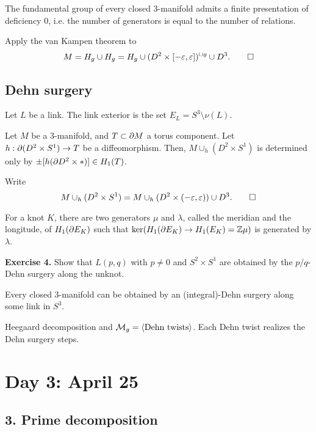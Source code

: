 \documentclass{../../../small}
\begin{document}
\begin{cor}
The fundamental group of every closed 3-manifold admits a finite presentation of deficiency 0, i.e. the number of generators is equal to the number of relations.
\end{cor}
\begin{pf}
Apply the van Kampen theorem to
\[M=H_g\cup H_g=H_g\cup(D^2\times[-\varepsilon,\varepsilon])^{\sqcup g}\cup D^3.\qedhere\]
\end{pf}

\subsection{Dehn surgery}
Let $L$ be a link.
The link exterior is the set $E_L=S^3\setminus\nu(L)$.

\begin{prop}
Let $M$ be a 3-manifold, and $T\subset\pd M$ a torus component.
Let $h:\pd(D^2\times S^1)\to T$ be a diffeomorphism.
Then, $M\cup_h(D^2\times S^1)$ is determined only by $\pm[h(\pd D^2\times*)]\in H_1(T)$.
\end{prop}
\begin{pf}
Write
\[M\cup_h(D^2\times S^1)=M\cup_h(D^2\times(-\varepsilon,\varepsilon))\cup D^3.\qedhere\]
\end{pf}
For a knot $K$, there are two generators $\mu$ and $\lambda$, called the meridian and the longitude, of $H_1(\pd E_K)$ such that $\ker(H_1(\pd E_K)\to H_1(E_K)=\Z\mu)$ is generated by $\lambda$.

\textbf{Exercise 4.} Show that $L(p,q)$ with $p\ne0$ and $S^2\times S^1$ are obtained by the $p/q$-Dehn surgery along the unknot.

\begin{thm}
Every closed 3-manifold can be obtained by an (integral)-Dehn surgery along some link in $S^3$.
\end{thm}
\begin{pf}[Sketch]
Heegaard decomposition and $\mathcal{M}_g=\langle\text{Dehn twists}\rangle$.
Each Dehn twist realizes the Dehn surgery steps.
\end{pf}

\newpage
\section{Day 3: April 25}
\subsection*{3. Prime decomposition}
\end{document}
